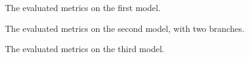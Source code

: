 \documentclass[twocolumn]{article}
\begin{document}
	\begin{figure}[h]
		\centering
		\caption{The evaluated metrics on the first model.}
		\label{fig:model1_metrics}
	\end{figure}
	\begin{figure}[h]
		\centering
		\caption{The evaluated metrics on the second model, with two branches.}
		\label{fig:model2_1_metrics}
	\end{figure}
	\begin{figure}[h]
		
		\centering
		\caption{The evaluated metrics on the third model.}
		\label{fig:model3_metrics}
	\end{figure}
	
\end{document}
